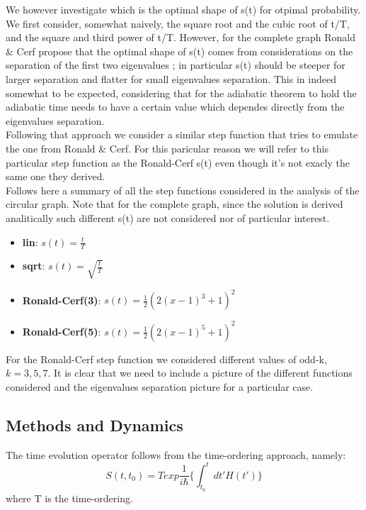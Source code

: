         We however investigate which is the optimal shape of s(t) for otpimal probability. We first consider, somewhat naively, the square root and the cubic root of t/T, and the square and third power of t/T. However, for the complete graph Ronald \& Cerf propose that the optimal shape of s(t) comes from considerations on the separation of the first two eigenvalues \cite{Roland2002}; in particular s(t) should be steeper for larger separation and flatter for small eigenvalues separation. This in indeed somewhat to be expected, considering that for the adiabatic theorem to hold the adiabatic time needs to have a certain value which dependes directly from the eigenvalues separation. \\
        Following that approach we consider a similar step function that tries to emulate the one from Ronald \& Cerf. For this paricular reason we will refer to this particular step function as the Ronald-Cerf s(t) even though it's not exacly the same one they derived. \\


        Follows here a summary of all the step functions considered in the analysis of the circular graph. Note that for the complete graph, since the solution is derived analitically such different s(t) are not considered nor of particular interest.
          \begin{itemize}
            \item \textbf{lin}: $s(t) = \frac{t}{T}$
            \item \textbf{sqrt}: $s(t) = \sqrt{\frac{t}{T}}$
            \item \textbf{Ronald-Cerf(3)}: $s(t) = \frac{1}{2}(2(x-1)^{3}+1)^2$
            \item \textbf{Ronald-Cerf(5)}: $s(t) = \frac{1}{2}(2(x-1)^{5}+1)^2$
          \end{itemize}
        For the Ronald-Cerf step function we considered different values of odd-k, $k=3,5,7$. It is clear that we need to include a picture of the different functions considered and the eigenvalues separation picture for a particular case.

    \subsection{Methods and Dynamics}
        The time evolution operator follows from the time-ordering approach, namely:
          \begin{equation}
            S(t,t_0) = T exp \frac{1}{i\hbar}\Big\{ \int_{t_0}^{t} dt' H(t')\Big\}
          \end{equation}
        where T is the time-ordering.


